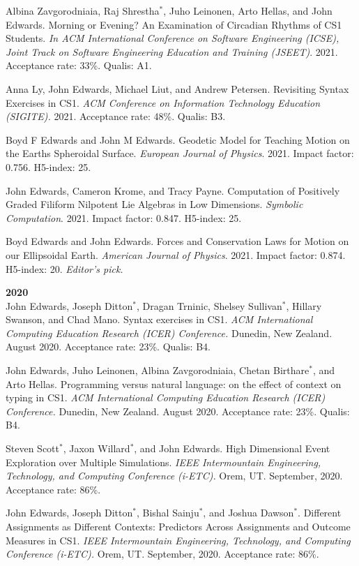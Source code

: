 \documentclass[margin,line]{res}
\newcommand{\pubunder}[1]{#1}
\newcommand{\pnum}[1]{}
\begin{document}
\begin{resume}
\pnum{31} Albina Zavgorodniaia, Raj Shrestha$^*$, Juho Leinonen, Arto Hellas, and John Edwards. Morning or Evening? An Examination of Circadian Rhythms of CS1 Students. \textit{In ACM International Conference on Software Engineering (ICSE), Joint Track on Software Engineering Education and Training (JSEET)}. 2021. Acceptance rate: 33\%. Qualis: A1.

\pnum{30} Anna Ly, John Edwards, Michael Liut, and Andrew Petersen. Revisiting Syntax Exercises in CS1. \textit{ACM Conference on Information Technology Education (SIGITE).} 2021. Acceptance rate: 48\%. Qualis: B3.

\pnum{29} Boyd F Edwards and John M Edwards. Geodetic Model for Teaching Motion on the Earths Spheroidal Surface. \textit{European Journal of Physics}. 2021. Impact factor: 0.756. H5-index: 25.

\pnum{28} John Edwards, Cameron Krome, and Tracy Payne. Computation of Positively Graded Filiform Nilpotent Lie Algebras in Low Dimensions. \textit{Symbolic Computation}. 2021. Impact factor: 0.847. H5-index: 25.

\pnum{27} Boyd Edwards and John Edwards. Forces and Conservation Laws for Motion on our Ellipsoidal Earth. \textit{American Journal of Physics}. 2021. Impact factor: 0.874. H5-index: 20. \textit{Editor's pick.}


\textbf{2020} \\
\pnum{26} John Edwards, Joseph Ditton$^*$, Dragan Trninic, Shelsey Sullivan$^*$, Hillary Swanson, and Chad Mano. Syntax exercises in CS1. \textit{ACM International Computing Education Research (ICER) Conference.} Dunedin, New Zealand. August 2020. Acceptance rate: 23\%. Qualis: B4.

\pnum{25} John Edwards, Juho Leinonen, Albina Zavgorodniaia, Chetan Birthare$^*$, and Arto Hellas. Programming versus natural language: on the effect of context on typing in CS1. \textit{ACM International Computing Education Research (ICER) Conference.} Dunedin, New Zealand. August 2020. Acceptance rate: 23\%. Qualis: B4.

\pnum{24} Steven Scott$^*$, Jaxon Willard$^*$, and \pubunder{John Edwards}. High Dimensional Event Exploration over Multiple Simulations. \textit{IEEE Intermountain Engineering, Technology, and Computing Conference (i-ETC).} Orem, UT. September, 2020. Acceptance rate: 86\%.

\pnum{23} John Edwards, Joseph Ditton$^*$, Bishal Sainju$^*$, and Joshua Dawson$^*$. Different Assignments as Different Contexts: Predictors Across Assignments and Outcome Measures in CS1. \textit{IEEE Intermountain Engineering, Technology, and Computing Conference (i-ETC).} Orem, UT. September, 2020. Acceptance rate: 86\%.


\end{resume}
\end{document}
